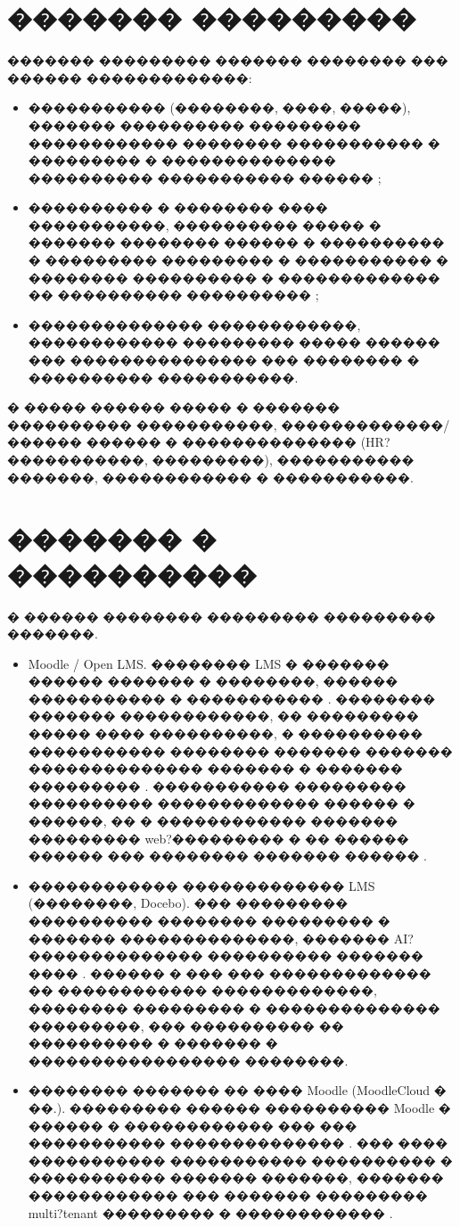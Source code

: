 \documentclass{G7-32}
\begin{document}
\section{������� ���������}

������� ��������� ������� �������� ��� ������ �������������:

\begin{itemize}
  \item ����������� (��������, ����, �����), ������� ���������� ��������� ������������ �������� ����������� � ��������� � �������������� ���������� ����������� ������ \cite{openlms,mobile-lms-features};
  \item ���������� � �������� ���� �����������, ���������� ����� � ������� �������� ������ � ���������� � ��������� ��������� � ����������� � �������� ���������� � ������������� �� ���������� ���������� \cite{mobile-learning-trends,docebo-adaptive};
  \item �������������� ������������, ������������ ��������� ����� ������ ��� ��������������� ��� �������� � ���������� �����������.
\end{itemize}

� ����� ������ ����� � ������� ���������� �����������, �������������/������ ������ � �������������� (HR?�����������, ���������), ����������� �������, ������������ � �����������.

\section{������� � ����������}

� ������ �������� ��������� ��������� �������.

\begin{itemize}
  \item Moodle / Open LMS. �������� LMS � ������� ������ ������� � ��������, ������ ����������� � ����������� \cite{moodle,openlms}. �������� ������� ������������, �� ��������� ����� ���� ����������, � ���������� ����������� �������� ������� ������� �������������� ������� � ������� ��������� \cite{adaptive-edu}. ����������� ��������� ���������� ������������� ������ � ������, �� � ������������ ������� ��������� web?��������� � �� ������ ������ ��� �������� ������� ������ \cite{moodleapp,moodlecloud}.
  \item ������������ ������������� LMS (��������, Docebo). ��� ��������� ���������� �������� ��������� � ������� ��������������, ������� AI?�������������� ���������� ������� ���� \cite{docebo-adaptive}. ������ � ��� ��� ������������� �� ������������ �������������, �������� ��������� � �������������� ���������, ��� ���������� �� ���������� � ������� � ����������������� ��������.
  \item �������� ������� �� ���� Moodle (MoodleCloud � ��.). ��������� ������ ���������� Moodle � ������ � ������������ ��� ��� ����������� �������������� \cite{moodlecloud}. ��� ���� ����������� ����������� ���������� � ����������� ������� �������, ������� ������������ ��� ������� ��������� multi?tenant ��������� � ������������ \cite{multitenant-moodle}.
\end{itemize}
\end{document}

